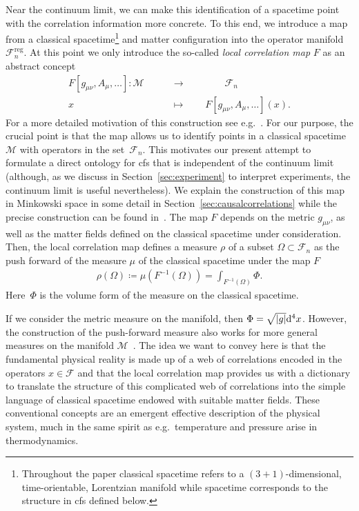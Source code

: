 \documentclass[reqno,11pt]{amsart}
\newcommand{\defeq}{\coloneqq}
\newcommand{\F}{{\mathcal{F}}}
\numberwithin{equation}{section}
\begin{document}
Near the continuum limit, we can make this identification of a spacetime point with the correlation information more concrete.
To this end, we introduce a map from a classical spacetime\footnote{
    Throughout the paper classical spacetime refers to a $(3 + 1)$-dimensional, time-orientable, Lorentzian manifold while
    spacetime corresponds to the structure in \ac{cfs} defined below.
} and matter configuration into the operator manifold~$\F_n^{\text{reg}}$.
At this point we only introduce the so-called \textit{local correlation map} $F$ as an abstract concept
\begin{align}\label{eq:localcorrelation}
    F[g_{\mu\nu}, A_\mu,\dots]: \mathcal{M}  \qquad &\to \qquad \qquad\F_n \\
    x \qquad &\mapsto \qquad F[g_{\mu\nu}, A_\mu,\dots](x).
\end{align}
For a more detailed motivation of this construction see e.g.~\cite{mmt-cfs}.
For our purpose, the crucial point is that the map allows us to identify points in a classical spacetime~$\mathcal{M}$
with operators in the set~$\F_n$.
This motivates our present attempt to formulate a direct ontology for \ac{cfs} that is independent of the continuum limit
(although, as we discuss in Section~\ref{sec:experiment} to interpret experiments, the continuum limit is useful nevertheless).
We explain the construction of this map in Minkowski space in some detail in Section~\ref{sec:causalcorrelations} while
the precise construction can be found in~\cite{cfs}.
The map $F$ depends on the metric $g_{\mu\nu}$, as well as the matter fields defined on the classical spacetime under consideration.
Then, the local correlation map defines a measure $\rho$ of a subset $\Omega \subset \F_n$ as the push forward of the
measure $\mu$ of the classical spacetime under the map $F$
\begin{align}
    \label{eq:pushforward}
    \rho(\Omega) \defeq \mu(F^{-1}(\Omega))= \int_{F^{-1}(\Omega)} \Phi.
\end{align}
Here~$\Phi$ is the volume form of the measure on the classical spacetime.

If we consider the metric measure on the manifold, then $\Phi = \sqrt{\abs{g}}\dd^4 x$.
However, the construction of the push-forward measure also works for more general measures on the manifold $\mathcal{M}$~\cite{mmt-cfs}.
The idea we want to convey here is that the fundamental physical reality is made up of a web of correlations encoded in
the operators $x \in \F$ and that the local correlation map provides us with a dictionary to translate the structure of
this complicated web of correlations into the simple language of classical spacetime endowed with suitable matter fields.
These conventional concepts are an emergent effective description of the physical system, much in the same spirit as
e.g.~temperature and pressure arise in thermodynamics.
\end{document}
